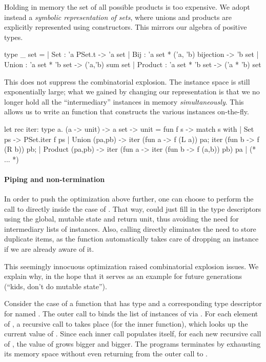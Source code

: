 Holding in memory the set of all possible products is too expensive. We adopt
instead a \emph{symbolic representation of sets}, where unions and products are
explicitly represented using constructors. This mirrors our algebra of positive
types.
%
\begin{ocamlcode}
type _ set =
  | Set   : 'a PSet.t -> 'a set
  | Bij   : 'a set * ('a, 'b) bijection -> 'b set
  | Union   : 'a set * 'b set -> ('a,'b) sum set
  | Product : 'a set * 'b set -> ('a * 'b) set
\end{ocamlcode}
%
This does not suppress the combinatorial explosion. The instance space is still
exponentially large; what we gained by changing our representation is that we
no longer hold all the ``intermediary'' instances in memory
\emph{simultaneously}. This allows us to write an  function that
constructs the various instances on-the-fly.
%
\begin{ocamlcode}
let rec iter: type a. (a -> unit) -> a set -> unit =
fun f s -> match s with
  | Set ps ->
      PSet.iter f ps
  | Union (pa,pb) ->
      iter (fun a -> f (L a)) pa;
      iter (fun b -> f (R b)) pb;
  | Product (pa,pb) ->
      iter (fun a -> iter (fun b -> f (a,b)) pb) pa
  | (* ... *)
\end{ocamlcode}
%

\paragraph{Piping and non-termination}
In order to push the optimization above further, one can choose to perform the
call to  directly inside the  case of .
That way,  could just fill in the type descriptors using the global,
mutable state and return unit, thus avoiding the need for intermediary lists of
instances. Also, calling  directly eliminates the need to store
duplicate items, as the function automatically takes care of dropping an
instance if we are already aware of it.

This seemingly innocuous optimization raised combinatorial explosion issues. We
explain why, in the hope that it serves as an example for future generations
(``kids, don't do mutable state'').

Consider the case of a function that has type  and a
corresponding type descriptor for  named . The outer call
to  binds the list of instances of  via . For each element of , a recursive call to  takes
place (for the inner  function), which looks up the current value
of . Since each inner call populates  itself, for
each new recursive call of , the value of  grows
bigger and bigger. The programs terminates by exhausting its memory space
without even returning from the outer call to .

